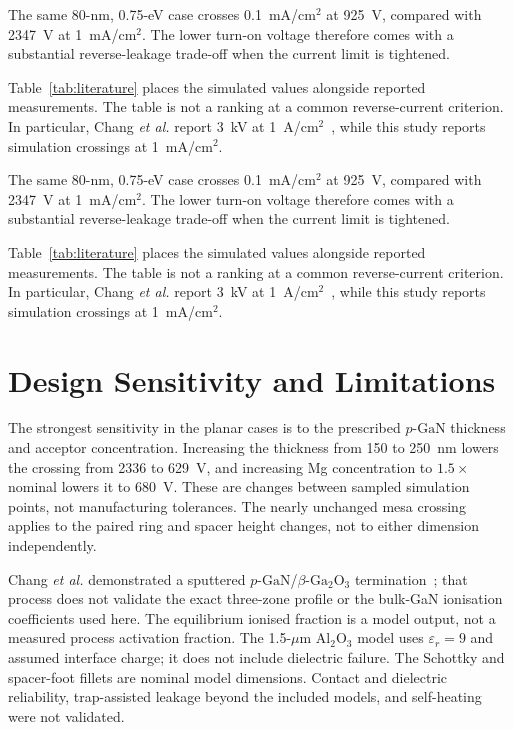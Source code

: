 \documentclass[journal,10pt]{IEEEtran}
\newcommand{\GaO}{\ensuremath{\beta\text{-}\mathrm{Ga}_2\mathrm{O}_3}}
\newcommand{\pGaN}{\ensuremath{p\text{-}\mathrm{GaN}}}
\begin{document}
The same 80-nm, 0.75-eV case crosses 0.1~mA/cm$^2$ at 925~V, compared with 2347~V at 1~mA/cm$^2$. The lower turn-on voltage therefore comes with a substantial reverse-leakage trade-off when the current limit is tightened.

Table~\ref{tab:literature} places the simulated values alongside reported measurements. The table is not a ranking at a common reverse-current criterion. In particular, Chang \emph{et al.} report 3~kV at 1~A/cm$^2$~\cite{Chang2025_APL}, while this study reports simulation crossings at 1~mA/cm$^2$.

The same 80-nm, 0.75-eV case crosses 0.1~mA/cm$^2$ at 925~V, compared with 2347~V at 1~mA/cm$^2$. The lower turn-on voltage therefore comes with a substantial reverse-leakage trade-off when the current limit is tightened.

Table~\ref{tab:literature} places the simulated values alongside reported measurements. The table is not a ranking at a common reverse-current criterion. In particular, Chang \emph{et al.} report 3~kV at 1~A/cm$^2$~\cite{Chang2025_APL}, while this study reports simulation crossings at 1~mA/cm$^2$.

\section{Design Sensitivity and Limitations}
The strongest sensitivity in the planar cases is to the prescribed \pGaN{} thickness and acceptor concentration. Increasing the thickness from 150 to 250~nm lowers the crossing from 2336 to 629~V, and increasing Mg concentration to $1.5\times$ nominal lowers it to 680~V. These are changes between sampled simulation points, not manufacturing tolerances. The nearly unchanged mesa crossing applies to the paired ring and spacer height changes, not to either dimension independently.

Chang \emph{et al.} demonstrated a sputtered \pGaN/\GaO{} termination~\cite{Chang2025_APL}; that process does not validate the exact three-zone profile or the bulk-GaN ionisation coefficients used here. The equilibrium ionised fraction is a model output, not a measured process activation fraction. The 1.5-$\mu$m Al$_2$O$_3$ model uses $\varepsilon_r=9$ and assumed interface charge; it does not include dielectric failure. The Schottky and spacer-foot fillets are nominal model dimensions. Contact and dielectric reliability, trap-assisted leakage beyond the included models, and self-heating were not validated.
\end{document}
